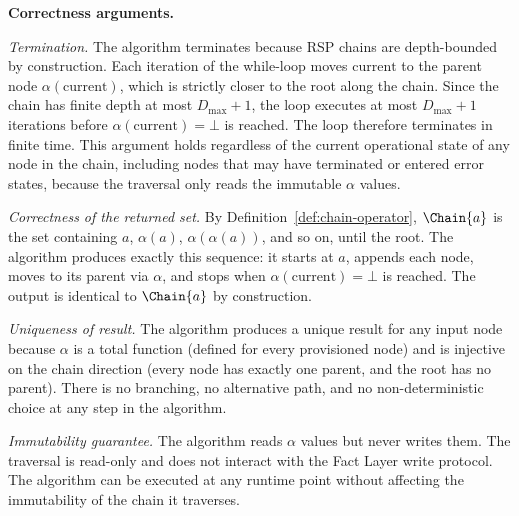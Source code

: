 \documentclass[12pt]{article}
\begin{document}
\medskip
\noindent\textbf{Correctness arguments.}

\textit{Termination.} The algorithm terminates because RSP chains are depth-bounded by construction. Each iteration of the while-loop moves $\text{current}$ to the parent node $\alpha(\text{current})$, which is strictly closer to the root along the chain. Since the chain has finite depth at most $D_{\max} + 1$, the loop executes at most $D_{\max} + 1$ iterations before $\alpha(\text{current}) = \bot$ is reached. The loop therefore terminates in finite time. This argument holds regardless of the current operational state of any node in the chain, including nodes that may have terminated or entered error states, because the traversal only reads the immutable $\alpha$ values.

\textit{Correctness of the returned set.} By Definition~\ref{def:chain-operator}, $\Chain{a}$ is the set containing $a$, $\alpha(a)$, $\alpha(\alpha(a))$, and so on, until the root. The algorithm produces exactly this sequence: it starts at $a$, appends each node, moves to its parent via $\alpha$, and stops when $\alpha(\text{current}) = \bot$ is reached. The output is identical to $\Chain{a}$ by construction.

\textit{Uniqueness of result.} The algorithm produces a unique result for any input node because $\alpha$ is a total function (defined for every provisioned node) and is injective on the chain direction (every node has exactly one parent, and the root has no parent). There is no branching, no alternative path, and no non-deterministic choice at any step in the algorithm.

\textit{Immutability guarantee.} The algorithm reads $\alpha$ values but never writes them. The traversal is read-only and does not interact with the Fact Layer write protocol. The algorithm can be executed at any runtime point without affecting the immutability of the chain it traverses.
\end{document}
